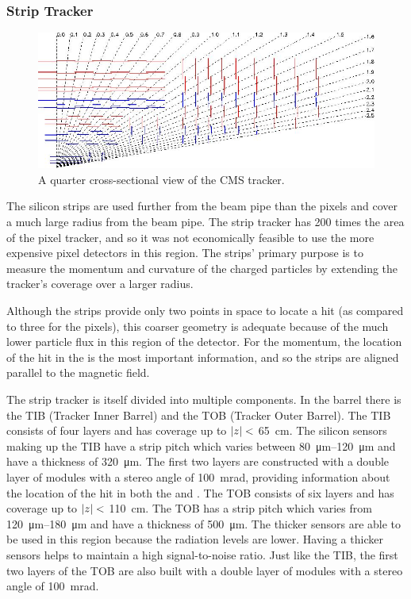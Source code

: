 \subsubsection{Strip Tracker}

\begin{figure}[!htbp]
    \centering
    \includegraphics[width=\textwidth]{figures/strip_layout.jpg}
    \caption{
        A quarter cross-sectional view of the CMS tracker.
    }
    \label{fig:strip_layout}
\end{figure}

The silicon strips are used further from the beam pipe than the pixels and
cover a much large radius from the beam pipe. The strip tracker has \num{200}
times the area of the pixel tracker, and so it was not economically feasible to
use the more expensive pixel detectors in this region. The strips' primary
purpose is to measure the momentum and curvature of the charged particles by
extending the tracker's coverage over a larger radius.

Although the strips provide only two points in space to locate a hit (as
compared to three for the pixels), this coarser geometry is adequate because of
the much lower particle flux in this region of the detector. For the momentum,
the location of the hit in the \rphiplane is the most important information,
and so the strips are aligned parallel to the magnetic field.

The strip tracker is itself divided into multiple components. In the barrel
there is the TIB (Tracker Inner Barrel) and the TOB (Tracker Outer Barrel). The
TIB consists of four layers and has coverage up to $|z|<$
\SI{65}{\centi\meter}. The silicon sensors making up the TIB have a strip pitch
which varies between \SIrange{80}{120}{\micro\meter} and have a thickness of
\SI{320}{\micro\meter}. The first two layers are constructed with a double
layer of modules with a stereo angle of \SI{100}{\milli\radian}, providing
information about the location of the hit in both the \coordrphi and \rzplane.
The TOB consists of six layers and has coverage up to $|z|<$
\SI{110}{\centi\meter}. The TOB has a strip pitch which varies from
\SIrange{120}{180}{\micro\meter} and have a thickness of
\SI{500}{\micro\meter}. The thicker sensors are able to be used in this region
because the radiation levels are lower. Having a thicker sensors helps to
maintain a high signal-to-noise ratio. Just like the TIB, the first two layers
of the TOB are also built with a double layer of modules with a stereo angle of
\SI{100}{\milli\radian}.

